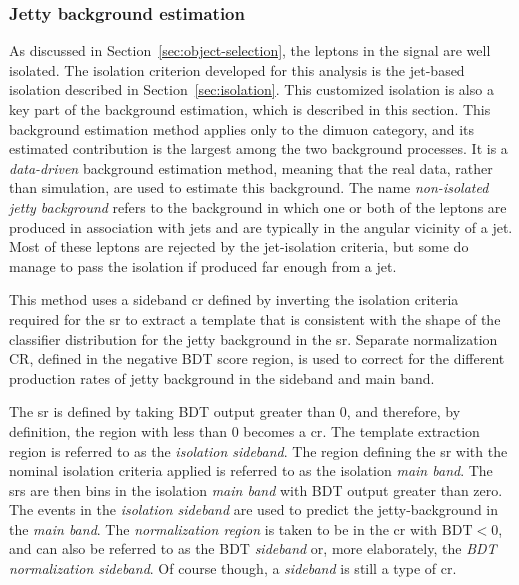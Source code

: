\subsubsection{Jetty background estimation}
\label{sec:jetty-background-estimation}

As discussed in Section~\ref{sec:object-selection}, the leptons in the signal are well isolated. The isolation criterion developed for this analysis is the jet-based isolation described in Section~\ref{sec:isolation}. This customized isolation is also a key part of the background estimation, which is described in this section. This background estimation method applies only to the dimuon category, and its estimated contribution is the largest among the two background processes. It is a \emph{data-driven} background estimation method, meaning that the real data, rather than simulation, are used to estimate this background. The name \emph{non-isolated jetty background} refers to the background in which one or both of the leptons are produced in association with jets and are typically in the angular vicinity of a jet. Most of these leptons are rejected by the jet-isolation criteria, but some do manage to pass the isolation if produced far enough from a jet.

This method uses a sideband \gls{cr} defined by inverting the isolation criteria required for the \gls{sr} to extract a template that is consistent with the shape of the classifier distribution for the jetty background in the \gls{sr}. Separate normalization CR, defined in the negative BDT score region, is used to correct for the different production rates of jetty background in the sideband and main band.

The \gls{sr} is defined by taking BDT output greater than 0, and therefore, by definition, the region with less than 0 becomes a \gls{cr}. The template extraction region is referred to as the \emph{isolation sideband}. The region defining the \gls{sr} with the nominal isolation criteria applied is referred to as the isolation \emph{main band}. The \glspl{sr} are then bins in the isolation \emph{main band} with BDT output greater than zero. The events in the \emph{isolation sideband} are used to predict the jetty-background in the \emph{main band}. The \emph{normalization region} is taken to be in the \gls{cr} with $\mathrm{BDT}<0$, and can also be referred to as the BDT \emph{sideband} or, more elaborately, the \emph{BDT normalization sideband}. Of course though, a \emph{sideband} is still a type of \gls{cr}.

